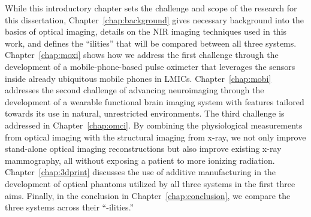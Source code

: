 While this introductory chapter sets the challenge and scope of the research for this dissertation, Chapter~\ref{chap:background} gives necessary background into the basics of optical imaging, details on the NIR imaging techniques used in this work, and defines the ``ilities'' that will be compared between all three systems. Chapter~\ref{chap:moxi} shows how we address the first challenge through the development of a mobile-phone-based pulse oximeter that leverages the sensors inside already ubiquitous mobile phones in LMICs. Chapter~\ref{chap:mobi} addresses the second challenge of advancing neuroimaging through the development of a wearable functional brain imaging system with features tailored towards its use in natural, unrestricted environments. The third challenge is addressed in Chapter~\ref{chap:omci}. By combining the physiological measurements from optical imaging with the structural imaging from x-ray, we not only improve stand-alone optical imaging reconstructions but also improve existing x-ray mammography, all without exposing a patient to more ionizing radiation. Chapter~\ref{chap:3dprint} discusses the use of additive manufacturing in the development of optical phantoms utilized by all three systems in the first three aims. Finally, in the conclusion in Chapter~\ref{chap:conclusion}, we compare the three systems across their ``-ilities.''


